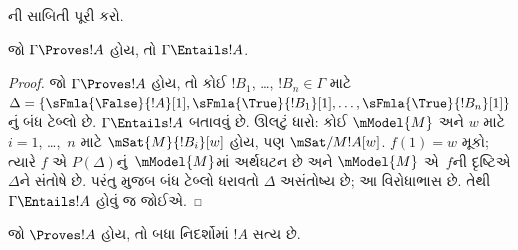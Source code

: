 \begin{prob}
ની
સાબિતી પૂરી કરો.
\end{prob}

\begin{cor}
જો $\Gamma \Proves !A$ હોય, તો
$\Gamma \Entails !A$.
\end{cor}

\begin{proof}
  જો $\Gamma \Proves !A$ હોય, તો કોઈ
  $!B_1$, \dots, $!B_n \in \Gamma$ માટે
  $\Delta = \{\sFmla{\False}{!A}[1],
  \sFmla{\True}{!B_1}[1], \dots,
  \sFmla{\True}{!B_n}[1]\}$નું બંધ
  ટેબ્લો છે. $\Gamma \Entails !A$
  બતાવવું છે. ઊલટું ધારો: કોઈ
  $\mModel{M}$ અને $w$ માટે $i=1$,
  \dots,~$n$ માટે $\mSat{M}{!B_i}[w]$
  હોય, પણ $\mSat/{M}{!A}[w]$.
  $f(1) = w$ મૂકો; ત્યારે $f$ એ
  $P(\Delta)$નું~$\mModel{M}$માં અર્થઘટન
  છે અને $\mModel{M}$ એ~$f$ની દૃષ્ટિએ
  $\Delta$ને સંતોષે છે. પરંતુ
   મુજબ બંધ
  ટેબ્લો ધરાવતો $\Delta$ અસંતોષ્ય છે;
  આ વિરોધાભાસ છે. તેથી
  $\Gamma \Entails !A$ હોવું જ જોઈએ.
\end{proof}

\begin{cor}
જો $\Proves !A$ હોય, તો બધા નિદર્શોમાં
$!A$ સત્ય છે.
\end{cor}
\endgroup


\OLEndChapterHook
\endgroup


\OLEndPartHook
